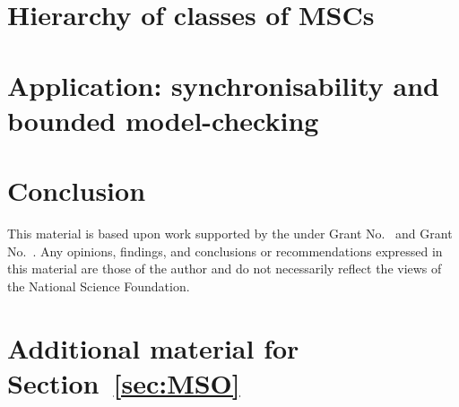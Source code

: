 \documentclass[acmsmall,review,anonymous,screen]{acmart}\settopmatter{printfolios=true,printccs=false,printacmref=true}
\begin{document}
\section{Hierarchy of classes of MSCs} \label{sec:hierarchy}



\section{Application: synchronisability and bounded model-checking}\label{sec:checking}



\section{Conclusion}\label{sec:conc}



\begin{acks}                            %
  This material is based upon work supported by the
   under Grant
  No.~ and Grant
  No.~.  Any opinions, findings, and
  conclusions or recommendations expressed in this material are those
  of the author and do not necessarily reflect the views of the
  National Science Foundation.
\end{acks}






\newpage

\ifappendix

\appendix

\section{Additional material for Section~\ref{sec:MSO}}
\label{apx:MSO}

\end{document}
